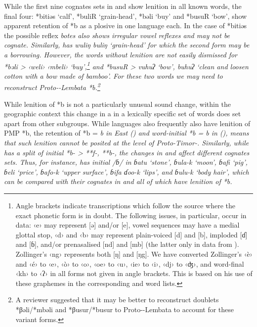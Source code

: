 While the first nine cognates sets in 
and  show lenition in all known  words,
the final four: *bitiəs ‘calf’,
*buliR ‘grain-head’, *bəli ‘buy’
and *busuR ‘bow’, show apparent retention of *b as a plosive
in one language each.
In the case of *bitiəs the possible  reflex \it{botes}
also shows irregular vowel reflexes
and may not be cognate.
Similarly,  has \it{wuliŋ} {\tl} \it{buliŋ} ‘grain-head’
for which the second form may be a borrowing.
However, the words without lenition are not easily dismissed
for  *bəli > ‹\it{weli}› \it{{\tl} ‹mbeli}› ‘buy’,\footnote{
		Angle brackets indicate transcriptions which follow the source where
		the exact phonetic form is in doubt.
		The following issues, in particular,
		occur in  data: ‹e› may represent [ə] and/or [e],
		vowel sequences may have a medial glottal stop,
		‹d› and ‹b› may represent plain-voiced [d]
		and [b], imploded [ɗ]
		and [ɓ], and/or prenasalised [nd]
		and [mb] (the latter only in data from \citealt{Zollinger1850}).
		Zollinger’s ‹ng› represents both [ŋ] and [ŋg].
		We have converted Zollinger’s ‹è›
		and ‹é› to ‹e›,
		‹ò› to ‹o›, ‹oe› to ‹u›,
		‹ie› to ‹i›, ‹dj› to ‹ʤ›,
		and word-final ‹kh› to ‹ʔ› in all  forms not
		given in angle brackets.
		This is based on his use of these graphemes in the corresponding
		 and  word lists.}
and   *busuR > \it{vuhuʔ} ‘bow’,
\it{buhuʔ} ‘clean and loosen cotton with a bow made of bamboo’.
For these two words we may need to reconstruct Proto--Lembata
*b.\footnote{
		A reviewer suggested that it may be better to reconstruct
		doublets *βəli/*mbəli and *βusur/*busur to Proto--Lembata to account for these
		variant forms.} 

While lenition of *b is not a particularly unusual sound change,
within the geographic context this change in a in a lexically specific set of words
does set  apart from other subgroups.
While  languages also frequently also have lenition
of PMP *b, the retention of *b = \it{b} in  East  ()
and word-initial *b = \it{b} in  (),
means that such lenition cannot be posited at the level of Proto-Timor-.
Similarly, while  has a split of initial *b- >
**f-, **b-, the changes in 
and  affect different cognates sets.
Thus, for instance,  has initial /ɓ/ in \it{ɓatu} ‘stone’,
\it{ɓula-k} ‘moon’, \it{ɓafi} ‘pig’,
\it{ɓeli} ‘price’, \it{ɓafo-k} ‘upper surface’, \it{ɓifa ɗoo-k}
‘lips’, and \it{ɓulu-k} ‘body hair’, which can be compared with their
 cognates in 
and  all of which have lenition of *b.

